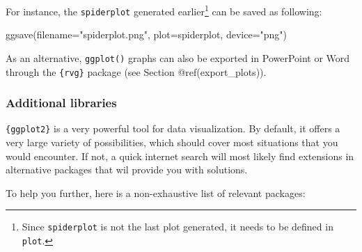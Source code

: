 \documentclass[
]{krantz}
\makeatletter
\newenvironment{Shaded}{\begin{snugshade}}{\end{snugshade}}
\newcommand{\AttributeTok}[1]{\textcolor[rgb]{0.61,0.61,0.61}{#1}}
\newcommand{\FunctionTok}[1]{\textcolor[rgb]{0,0,0}{#1}}
\newcommand{\NormalTok}[1]{#1}
\newcommand{\StringTok}[1]{\textcolor[rgb]{0.5,0.5,0.5}{#1}}
\newenvironment{kframe}{%
\medskip{}
\setlength{\fboxsep}{.8em}
 \def\at@end@of@kframe{}%
 \ifinner\ifhmode%
  \def\at@end@of@kframe{\end{minipage}}%
  \begin{minipage}{\columnwidth}%
 \fi\fi%
 \def\FrameCommand##1{\hskip\@totalleftmargin \hskip-\fboxsep
 \colorbox{shadecolor}{##1}\hskip-\fboxsep
     \hskip-\linewidth \hskip-\@totalleftmargin \hskip\columnwidth}%
 \MakeFramed {\advance\hsize-\width
   \@totalleftmargin\z@ \linewidth\hsize
   \@setminipage}}%
 {\par\unskip\endMakeFramed%
 \at@end@of@kframe}
\renewenvironment{Shaded}{\begin{kframe}}{\end{kframe}}
\makeatother
\begin{document}
For instance, the \texttt{spiderplot} generated earlier\footnote{Since \texttt{spiderplot} is not the last plot generated, it needs to be defined in \texttt{plot}.} can be saved as following:

\begin{Shaded}
\begin{Highlighting}[]
\FunctionTok{ggsave}\NormalTok{(}\AttributeTok{filename=}\StringTok{"spiderplot.png"}\NormalTok{, }\AttributeTok{plot=}\NormalTok{spiderplot, }\AttributeTok{device=}\StringTok{"png"}\NormalTok{)}
\end{Highlighting}
\end{Shaded}

As an alternative, \texttt{ggplot()} graphs can also be exported in PowerPoint or Word through the \texttt{\{rvg\}} package (see Section @ref(export\_plots)).

\hypertarget{additional-libraries}{%
\subsubsection{Additional libraries}\label{additional-libraries}}

\texttt{\{ggplot2\}} is a very powerful tool for data visualization. By default, it offers a very large variety of possibilities, which should cover most situations that you would encounter. If not, a quick internet search will most likely find extensions in alternative packages that wil provide you with solutions.

To help you further, here is a non-exhaustive list of relevant packages:
\end{document}
